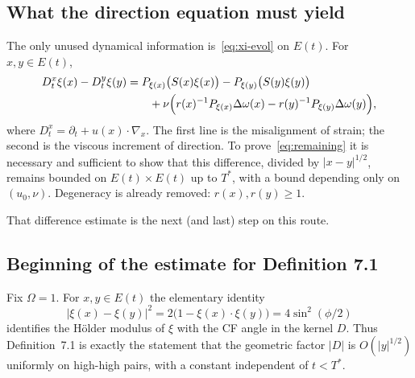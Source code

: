 \documentclass[11pt,a4paper]{article}
\theoremstyle{definition}
\theoremstyle{remark}
\newcommand{\abs}[1]{\lvert#1\rvert}
\begin{document}
\subsection{What the direction equation must yield}

The only unused dynamical information is~\eqref{eq:xi-evol} on \(E(t)\).
For \(x,y\in E(t)\),
\begin{equation}
\label{eq:xi-diff}
\begin{split}
D_t^x\xi(x)-D_t^y\xi(y)
&=P_{\xi(x)}\bigl(S(x)\xi(x)\bigr)
-P_{\xi(y)}\bigl(S(y)\xi(y)\bigr)\\
&\qquad
+\nu\Bigl(r(x)^{-1}P_{\xi(x)}\Delta\omega(x)
-r(y)^{-1}P_{\xi(y)}\Delta\omega(y)\Bigr),
\end{split}
\end{equation}
where \(D_t^x=\partial_t+u(x)\cdot\nabla_x\). The first line is the
misalignment of strain; the second is the viscous increment of direction.
To prove~\eqref{eq:remaining} it is necessary and sufficient to show that
this difference, divided by \(\abs{x-y}^{1/2}\), remains bounded on
\(E(t)\times E(t)\) up to \(T^*\), with a bound depending only on
\((u_0,\nu)\). Degeneracy is already removed: \(r(x),r(y)\ge 1\).

That difference estimate is the next (and last) step on this route.

\subsection{Beginning of the estimate for Definition 7.1}

Fix \(\Omega=1\). For \(x,y\in E(t)\) the elementary identity
\begin{equation}
\label{eq:xi-inner}
\abs{\xi(x)-\xi(y)}^2
=2\bigl(1-\xi(x)\cdot\xi(y)\bigr)
=4\sin^2(\phi/2)
\end{equation}
identifies the H\"older modulus of \(\xi\) with the CF angle in the
kernel \(D\). Thus Definition~7.1 is exactly the statement that the
geometric factor \(\abs{D}\) is \(O(\abs{y}^{1/2})\) uniformly on
high-high pairs, with a constant independent of \(t<T^*\).
\end{document}
